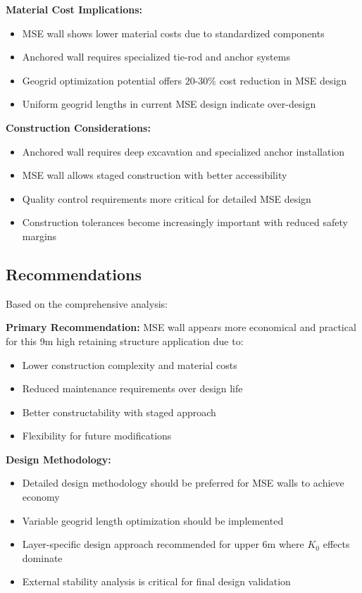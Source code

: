 \documentclass[10pt,a4paper,twocolumn]{article}
\begin{document}
\textbf{Material Cost Implications:}
\begin{itemize}
\item MSE wall shows lower material costs due to standardized components
\item Anchored wall requires specialized tie-rod and anchor systems
\item Geogrid optimization potential offers 20-30\% cost reduction in MSE design
\item Uniform geogrid lengths in current MSE design indicate over-design
\end{itemize}

\textbf{Construction Considerations:}
\begin{itemize}
\item Anchored wall requires deep excavation and specialized anchor installation
\item MSE wall allows staged construction with better accessibility
\item Quality control requirements more critical for detailed MSE design
\item Construction tolerances become increasingly important with reduced safety margins
\end{itemize}

\subsection{Recommendations}

Based on the comprehensive analysis:

\textbf{Primary Recommendation:}
MSE wall appears more economical and practical for this 9m high retaining structure application due to:
\begin{itemize}
\item Lower construction complexity and material costs
\item Reduced maintenance requirements over design life
\item Better constructability with staged approach
\item Flexibility for future modifications
\end{itemize}

\textbf{Design Methodology:}
\begin{itemize}
\item Detailed design methodology should be preferred for MSE walls to achieve economy
\item Variable geogrid length optimization should be implemented
\item Layer-specific design approach recommended for upper 6m where $K_0$ effects dominate
\item External stability analysis is critical for final design validation
\end{itemize}
\end{document}
